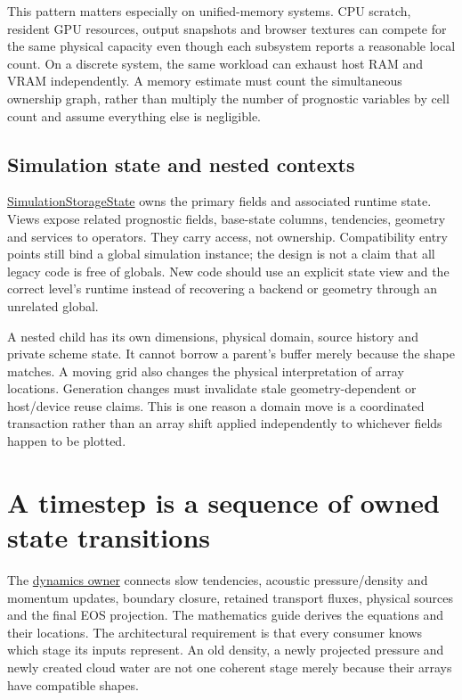 This pattern matters especially on unified-memory systems. CPU scratch,
resident GPU resources, output snapshots and browser textures can compete for
the same physical capacity even though each subsystem reports a reasonable
local count. On a discrete system, the same workload can exhaust host RAM and
VRAM independently. A memory estimate must count the simultaneous ownership
graph, rather than multiply the number of prognostic variables by cell count
and assume everything else is negligible.

\subsection{Simulation state and nested contexts}

\href{../include/core/runtime/simulation_state.hpp}{SimulationStorageState}
owns the primary fields and associated runtime state. Views expose related
prognostic fields, base-state columns, tendencies, geometry and services to
operators. They carry access, not ownership. Compatibility entry points still
bind a global simulation instance; the design is not a claim that all legacy
code is free of globals. New code should use an explicit state view and the
correct level's runtime instead of recovering a backend or geometry through an
unrelated global.

A nested child has its own dimensions, physical domain, source history and
private scheme state. It cannot borrow a parent's buffer merely because the
shape matches. A moving grid also changes the physical interpretation of
array locations. Generation changes must invalidate stale geometry-dependent
or host/device reuse claims. This is one reason a domain move is a coordinated
transaction rather than an array shift applied independently to whichever
fields happen to be plotted.

\section{A timestep is a sequence of owned state transitions}

The \href{../src/core/orchestration/dynamics/dynamics.cpp}{dynamics owner}
connects slow tendencies, acoustic pressure/density and momentum updates,
boundary closure, retained transport fluxes, physical sources and the final
EOS projection. The mathematics guide derives the equations and their
locations. The architectural requirement is that every consumer knows which
stage its inputs represent. An old density, a newly projected pressure and
newly created cloud water are not one coherent stage merely because their
arrays have compatible shapes.

